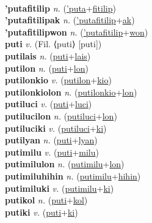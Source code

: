  \label{'puta} \\
\textbf{'putafitilip} \textit{n.} (\hyperref['puta]{'puta}+\hyperref[fitilip]{fitilip})
 \label{'putafitilip} \\
\textbf{'putafitilipak} \textit{n.} (\hyperref['putafitilip]{'putafitilip}+\hyperref[ak]{ak})
 \label{'putafitilipak} \\
\textbf{'putafitilipwon} \textit{n.} (\hyperref['putafitilip]{'putafitilip}+\hyperref[won]{won})
 \label{'putafitilipwon} \\
\textbf{puti} \textit{v.} (Fil. ⟨puti⟩ [puti])
 \label{puti} \\
\textbf{putilais} \textit{n.} (\hyperref[puti]{puti}+\hyperref[lais]{lais})
 \label{putilais} \\
\textbf{putilon} \textit{n.} (\hyperref[puti]{puti}+\hyperref[lon]{lon})
 \label{putilon} \\
\textbf{putilonkio} \textit{v.} (\hyperref[putilon]{putilon}+\hyperref[kio]{kio})
 \label{putilonkio} \\
\textbf{putilonkiolon} \textit{n.} (\hyperref[putilonkio]{putilonkio}+\hyperref[lon]{lon})
 \label{putilonkiolon} \\
\textbf{putiluci} \textit{v.} (\hyperref[puti]{puti}+\hyperref[luci]{luci})
 \label{putiluci} \\
\textbf{putilucilon} \textit{n.} (\hyperref[putiluci]{putiluci}+\hyperref[lon]{lon})
 \label{putilucilon} \\
\textbf{putiluciki} \textit{v.} (\hyperref[putiluci]{putiluci}+\hyperref[ki]{ki})
 \label{putiluciki} \\
\textbf{putilyan} \textit{n.} (\hyperref[puti]{puti}+\hyperref[lyan]{lyan})
 \label{putilyan} \\
\textbf{putimilu} \textit{v.} (\hyperref[puti]{puti}+\hyperref[milu]{milu})
 \label{putimilu} \\
\textbf{putimilulon} \textit{n.} (\hyperref[putimilu]{putimilu}+\hyperref[lon]{lon})
 \label{putimilulon} \\
\textbf{putimiluhihin} \textit{n.} (\hyperref[putimilu]{putimilu}+\hyperref[hihin]{hihin})
 \label{putimiluhihin} \\
\textbf{putimiluki} \textit{v.} (\hyperref[putimilu]{putimilu}+\hyperref[ki]{ki})
 \label{putimiluki} \\
\textbf{putikol} \textit{n.} (\hyperref[puti]{puti}+\hyperref[kol]{kol})
 \label{putikol} \\
\textbf{putiki} \textit{v.} (\hyperref[puti]{puti}+\hyperref[ki]{ki})
 \label{putiki} \\
